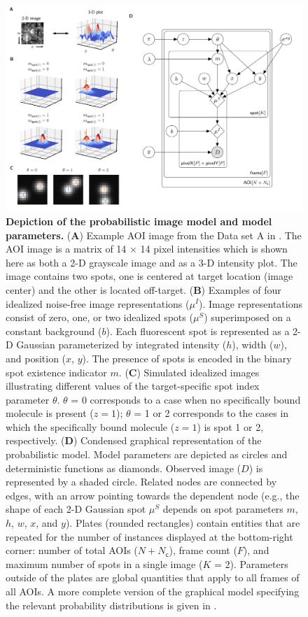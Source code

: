 \begin{figure}
\begin{fullwidth}
\includegraphics[width=183mm]{figures/graphical_model.png}
\caption{\textbf{Depiction of the probabilistic image model and model parameters.} (\textbf{A}) Example AOI image from the Data set A in . The AOI image is a matrix of 14 $\times$ 14 pixel intensities which is shown here as both a 2-D grayscale image and as a 3-D intensity plot. The image contains two spots, one is centered at target location (image center) and the other is located off-target. (\textbf{B}) Examples of four idealized noise-free image representations ($\mu^I$). Image representations consist of zero, one, or two idealized spots ($\mu^S$) superimposed on a constant background ($b$). Each fluorescent spot is represented as a 2-D Gaussian parameterized by integrated intensity ($h$), width ($w$), and position ($x$, $y$). The presence of spots is encoded in the binary spot existence indicator $m$. (\textbf{C}) Simulated idealized images illustrating different values of the target-specific spot index parameter $\theta$. $\theta$ = 0 corresponds to a case when no specifically bound molecule is present ($z = 1$); $\theta$ = 1 or 2 corresponds to the cases in which the specifically bound molecule ($z = 1$) is spot 1 or 2, respectively. (\textbf{D}) Condensed graphical representation of the probabilistic model. Model parameters are depicted as circles and deterministic functions as diamonds. Observed image ($D$) is represented by a shaded circle. Related nodes are connected by edges, with an arrow pointing towards the dependent node (e.g., the shape of each 2-D Gaussian spot $\mu^S$ depends on spot parameters $m$, $h$, $w$, $x$, and $y$). Plates (rounded rectangles) contain entities that are repeated for the number of instances displayed at the bottom-right corner: number of total AOIs ($N+N_\mathsf{c}$), frame count ($F$), and maximum number of spots in a single image ($K$ = 2). Parameters outside of the plates are global quantities that apply to all frames of all AOIs. A more complete version of the graphical model specifying the relevant probability distributions is given in . }

\end{fullwidth}
\end{figure}
